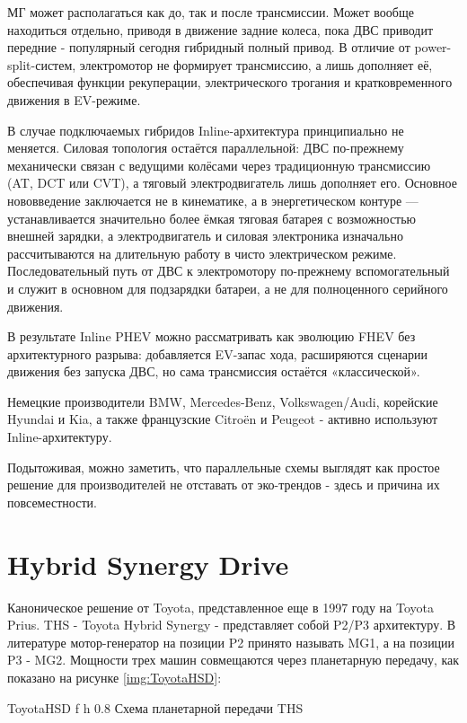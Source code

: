 МГ может располагаться как до, так и после трансмиссии. Может вообще находиться отдельно, приводя в движение задние колеса, пока ДВС приводит передние - популярный сегодня гибридный полный привод. В отличие от power-split-систем, электромотор не формирует трансмиссию, а лишь дополняет её, обеспечивая функции рекуперации, электрического трогания и кратковременного движения в EV-режиме.

В случае подключаемых гибридов Inline-архитектура принципиально не меняется. Силовая топология остаётся параллельной: ДВС по-прежнему механически связан с ведущими колёсами через традиционную трансмиссию (AT, DCT или CVT), а тяговый электродвигатель лишь дополняет его. Основное нововведение заключается не в кинематике, а в энергетическом контуре — устанавливается значительно более ёмкая тяговая батарея с возможностью внешней зарядки, а электродвигатель и силовая электроника изначально рассчитываются на длительную работу в чисто электрическом режиме. Последовательный путь от ДВС к электромотору по-прежнему вспомогательный и служит в основном для подзарядки батареи, а не для полноценного серийного движения.

В результате Inline PHEV можно рассматривать как эволюцию FHEV без архитектурного разрыва: добавляется EV-запас хода, расширяются сценарии движения без запуска ДВС, но сама трансмиссия остаётся «классической».

Немецкие производители BMW, Mercedes-Benz, Volkswagen/Audi, корейские Hyundai и Kia, а также французские Citroën и Peugeot - активно используют Inline-архитектуру.

Подытоживая, можно заметить, что параллельные схемы выглядят как простое решение для производителей не отставать от эко-трендов - здесь и причина их повсеместности.

\newpage

\section{Hybrid Synergy Drive}

Каноническое решение от Toyota, представленное еще в 1997 году на Toyota Prius. THS - Toyota Hybrid Synergy - представляет собой P2/P3 архитектуру. В литературе мотор-генератор на позиции P2 принято называть MG1, а на позиции P3 - MG2. Мощности трех машин совмещаются через планетарную передачу, как показано на рисунке \ref{img:ToyotaHSD}:

    {ToyotaHSD} %
    {f} %
    {h} %
    {0.8\textwidth} %
    {Схема планетарной передачи THS \cite{THS}} %


